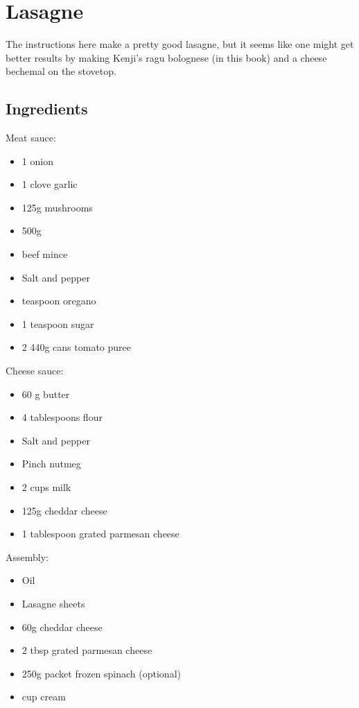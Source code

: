 \section{Lasagne}


The instructions here make a pretty good lasagne, but it seems like one might get better results by making Kenji's ragu bolognese (in this book) and a cheese bechemal on the stovetop.

\subsection{Ingredients}

Meat sauce:

\begin{itemize}
    \item 1 onion
    \item 1 clove garlic
    \item 125g mushrooms
    \item 500g
    \item beef mince
    \item Salt and pepper
    \item {} teaspoon oregano
    \item 1 teaspoon sugar
    \item 2 440g cans tomato puree
\end{itemize}

Cheese sauce:

\begin{itemize}
    \item 60 g butter
    \item 4 tablespoons flour
    \item Salt and pepper
    \item Pinch nutmeg
    \item 2 cups milk
    \item 125g cheddar cheese
    \item 1 tablespoon grated parmesan cheese
\end{itemize}

Assembly:

\begin{itemize}
    \item Oil
    \item Lasagne sheets
    \item 60g cheddar cheese
    \item 2 tbsp grated parmesan cheese
    \item 250g packet frozen spinach (optional)
    \item {} cup cream
\end{itemize}

